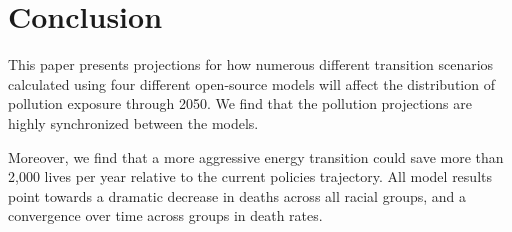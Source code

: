 \documentclass[a4paper]{article}
\theoremstyle{definition}
\theoremstyle{plain}
\begin{document}
\section{Conclusion}
This paper presents projections for how numerous different transition scenarios calculated using four different open-source models will affect the distribution of pollution exposure through 2050.  We find that the pollution projections are highly synchronized between the models.  

Moreover, we find that a more aggressive energy transition could save more than 2,000 lives per year relative to the current policies trajectory.  All model results point towards a dramatic decrease in deaths across all racial groups, and a convergence over time across groups in death rates.

\begin{singlespace}
\newpage

%

\end{singlespace}
\end{document}
